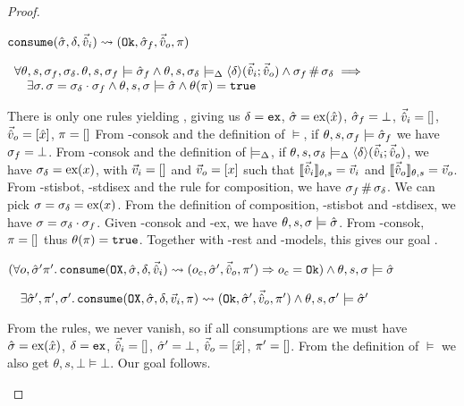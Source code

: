 \begin{proof}
\pfassume \begin{hypvlist}
 $\texttt{consume}(\hat{\sigma},\delta,\vec{\hat{v}}_i)\rightsquigarrow (\texttt{Ok},\hat{\sigma}_f,\vec{\hat{v}}_o,\pi)$
\end{hypvlist}
\pfprove \begin{goalvlist}
 $\begin{array}{l}
\forall \theta,s,\sigma_f,\sigma_\delta\ldotp \theta,s,\sigma_f\models \hat{\sigma}_f \land \theta, s, \sigma_\delta \models_{\Delta} \left<\delta\right>\!(\vec{\hat{v}}_i;\vec{\hat{v}}_o) \land \sigma_f\operatorname{\#}\sigma_\delta \implies \\
\quad \exists \sigma\ldotp \sigma = \sigma_\delta \cdot \sigma_f \land \theta,s,\sigma\models \hat{\sigma} \land \theta(\pi)=\texttt{true}
\end{array}$
\end{goalvlist}
\begin{hypvlist}
 There is only one \consume{} rules yielding \Ok, giving us $\delta=\texttt{ex}$, $\hat{\sigma}=\text{ex}(\hat{x})$, $\hat{\sigma}_f=\bot$, $\vec{\hat{v}}_i=[]$, $\vec{\hat{v}}_o=[\hat{x}]$, $\pi=[]$
 From \hyp{consok} and the definition of $\models$, if $\theta,s,\sigma_f\models\hat{\sigma}_f$ we have $\sigma_f=\bot$.
 From \hyp{consok} and the definition of $\models_{\Delta}$, if $\theta,s,\sigma_\delta\models_{\Delta}\left<\delta\right>\!(\vec{\hat{v}}_i;\vec{\hat{v}}_o)$, we have $\sigma_\delta=\text{ex}(x)$, with $\vec{v}_i=[]$ and $\vec{v}_o=[x]$ such that $\llbracket\vec{\hat{v}}_i\rrbracket_{\theta,s}=\vec{v}_i$ and $\llbracket\vec{\hat{v}}_o\rrbracket_{\theta,s}=\vec{v}_o$.
 From \hyp{stisbot}, \hyp{stdisex} and the rule for composition, we have $\sigma_f\operatorname{\#}\sigma_\delta$.
 We can pick $\sigma=\sigma_\delta=\text{ex}(x)$.
 From the definition of composition, \hyp{stisbot} and \hyp{stdisex}, we have $\sigma=\sigma_\delta\cdot\sigma_f$.
 Given \hyp{consok} and \hyp{ex}, we have $\theta,s,\sigma\models\hat{\sigma}$.
 From \hyp{consok}, $\pi=[]$ thus $\theta(\pi)=\texttt{true}$. Together with \hyp{rest} and \hyp{models}, this gives our goal .
\end{hypvlist}


\pfassume \begin{hypvlist}
 $(\forall o, \hat{\sigma}'\pi'\ldotp \texttt{consume}(\texttt{OX},\hat{\sigma},\delta,\vec{\hat{v}}_i)\rightsquigarrow (o_c, \hat{\sigma}', \vec{\hat{v}}_o, \pi')\Rightarrow o_c = \texttt{Ok})\land \theta, s, \sigma \models \hat{\sigma}$
\end{hypvlist}
\pfprove \begin{goalvlist}
 $\quad \exists  \hat{\sigma}', \pi', \sigma'\ldotp \texttt{consume}(\texttt{OX}, \hat{\sigma}, \delta,\vec{v}_i,\pi)\rightsquigarrow (\texttt{Ok}, \hat{\sigma}', \vec{\hat{v}}_o, \pi') \land \theta,s,\sigma' \models \hat{\sigma}'$
\end{goalvlist}
\begin{hypvlist}
 From the \consume{} rules, we never vanish, so if all consumptions are \Ok{} we must have $\hat{\sigma}=\text{ex}(\hat{x})$, $\delta=\texttt{ex}$, $\vec{\hat{v}}_i=[]$, $\hat{\sigma}'=\bot$, $\vec{\hat{v}}_o=[\hat{x}]$, $\pi'=[]$.
 From the definition of $\models$ we also get $\theta,s,\bot\models\bot$. Our goal  follows.
\end{hypvlist}


\end{proof}

